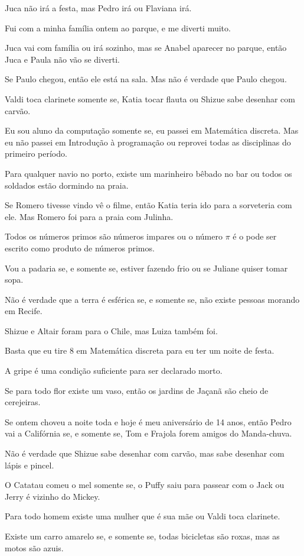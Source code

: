 \begin{exerList}
	\item Juca não irá a festa, mas Pedro irá ou Flaviana irá.
	\item Fui com a minha família ontem ao parque, e me diverti muito.
	\item Juca vai com família ou irá sozinho, mas se Anabel aparecer no parque, então Juca e Paula não vão se diverti.
	\item Se Paulo chegou, então ele está na sala. Mas não é verdade que Paulo chegou.
	\item Valdi toca clarinete somente se, Katia tocar flauta ou Shizue sabe desenhar com carvão.
	\item Eu sou aluno da computação somente se, eu passei em Matemática discreta. Mas eu não passei em Introdução à programação ou reprovei todas as disciplinas do primeiro período.
	\item Para qualquer navio no porto, existe um marinheiro bêbado no bar ou todos os soldados estão dormindo na praia.
	\item Se Romero tivesse vindo vê o filme, então Katia teria ido para a sorveteria com ele. Mas Romero foi para a praia com Julinha.
	\item Todos os números primos são números impares ou o número $\pi$ é o pode ser escrito como produto de números primos.
	\item Vou a padaria se, e somente se, estiver fazendo frio ou se Juliane quiser tomar sopa.
	\item Não é verdade que a terra é esférica se, e somente se, não existe pessoas morando em Recife.
	\item Shizue e Altair foram para o Chile, mas Luiza também foi.
	\item Basta que eu tire 8 em Matemática discreta para eu ter um noite de festa.
	\item A gripe é uma condição suficiente para ser declarado morto.
	\item Se para todo flor existe um vaso, então os jardins de Jaçanã são cheio de cerejeiras. 
	\item Se ontem choveu a noite toda e hoje é meu aniversário de 14 anos, então Pedro vai a Califórnia se, e somente se, Tom e Frajola forem amigos do Manda-chuva.
	\item Não é verdade que Shizue sabe desenhar com carvão, mas sabe desenhar com lápis e pincel.
	\item O Catatau comeu o mel somente se, o Puffy saiu para passear com o Jack ou Jerry é vizinho do Mickey.
	\item Para todo homem existe uma mulher que é sua mãe ou Valdi toca clarinete.
	\item Existe um carro amarelo se, e somente se, todas bicicletas são roxas, mas as motos são azuis. 
\end{exerList}


